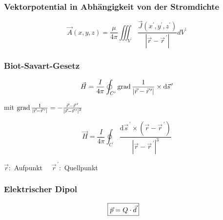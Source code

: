 \subsubsection{Vektorpotential in Abhängigkeit von der Stromdichte}
\[
    \vec{A}(x, y, z)=\frac{\mu}{4 \pi} \iiint_{V^{\prime}} \frac{\vec{J}\left(x^{\prime}, y^{\prime}, z^{\prime}\right)}{\left|\vec{r}-\vec{r}^{\,\prime}\right|} d V^{\prime}
\]

\subsubsection{Biot-Savart-Gesetz}
\[
    \vec{H}=\frac{I}{4 \pi} \oint_{C^{\prime}} \operatorname{grad} \frac{1}{\left|\vec{r}-\vec{r}^{\,\prime}\right|} \times \mathrm{d} \vec{s}^{\,\prime}
\]

mit $\operatorname{grad} \frac{1}{\left|\vec{r}-\vec{r}^{\,\prime}\right|}=-\frac{\vec{r}-\vec{r}^{\,\prime}}{\left|\vec{r}-\vec{r}^{\,\prime}\right|^{3}}$

\[
    \vec{H}=\frac{I}{4 \pi} \oint_{C^{\prime}} \frac{\mathrm{d} \vec{s}^{\,\prime} \times\left(\vec{r}-\vec{r}^{\,\prime}\right)}{\left|\vec{r}-\vec{r}^{\,\prime}\right|^{3}}
\]

{\footnotesize$\vec{r}:$ Aufpunkt $\quad \vec{r}^{\,\prime}:$ Quellpunkt}

\subsubsection{Elektrischer Dipol}

\begin{align*}
    \Aboxed{\vec{p} = Q\cdot\vec{d}}
\end{align*}



